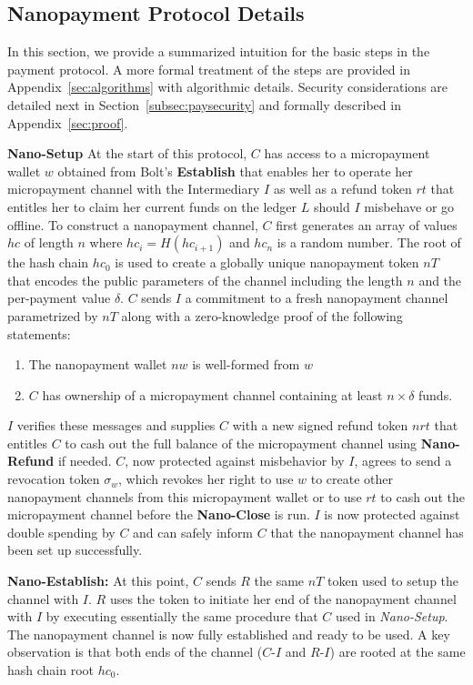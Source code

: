 \subsection{Nanopayment Protocol Details}

\label{sec:nanopaymentdetails} In this section, we provide a summarized intuition for the basic steps in the payment protocol.
A more formal treatment of the steps are provided in Appendix~\ref{sec:algorithms} with algorithmic details.
Security considerations are detailed next in Section~\ref{subsec:paysecurity} and formally described in Appendix~\ref{sec:proof}.

\medskip \noindent\textbf{Nano-Setup} At the start of this protocol, $C$ has access to a micropayment wallet $w$ obtained from Bolt's \textbf{Establish} that enables her to operate her micropayment channel with the Intermediary $I$ as well as a refund token $rt$ that entitles her to claim her current funds on the ledger $L$ should $I$ misbehave or go offline.
To construct a nanopayment channel, $C$ first generates an array of values $hc$ of length $n$ where $hc_i = H(hc_{i+1})$ and $hc_n$ is a random number.
The root of the hash chain $hc_0$ is used to create a globally unique nanopayment token $nT$ that encodes the public parameters of the channel including the length $n$ and the per-payment value $\delta$.
$C$ sends $I$ a commitment to a fresh nanopayment channel parametrized by $nT$ along with a zero-knowledge proof of the following statements:

\begin{enumerate}
\item The nanopayment wallet $nw$ is well-formed from $w$
\item $C$ has ownership of a micropayment channel containing at least $n \times \delta$ funds.
\end{enumerate}

$I$ verifies these messages and supplies $C$ with a new signed refund token $nrt$ that entitles $C$ to cash out the full balance of the micropayment channel using \textbf{Nano-Refund} if needed.
$C$, now protected against misbehavior by $I$, agrees to send a revocation token $\sigma_w$, which revokes her right to use $w$ to create other nanopayment channels from this micropayment wallet or to use $rt$ to cash out the micropayment channel before the \textbf{Nano-Close} is run.
$I$ is now protected against double spending by $C$ and can safely inform $C$ that the nanopayment channel has been set up successfully.

\medskip \noindent\textbf{Nano-Establish:} At this point, $C$ sends $R$ the same $nT$ token used to setup the channel with $I$.
$R$ uses the token to initiate her end of the nanopayment channel with $I$ by executing essentially the same procedure that $C$ used in \emph{Nano-Setup}.
The nanopayment channel is now fully established and ready to be used.
A key observation is that both ends of the channel ($C$-$I$ and $R$-$I$) are rooted at the same hash chain root $hc_0$.

